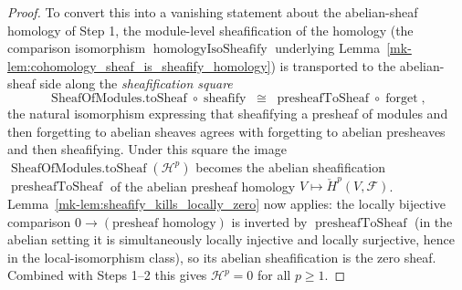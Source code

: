 \begin{proof}
  To convert this into a vanishing statement about the abelian-sheaf homology of Step 1, the
  module-level sheafification of the homology (the comparison isomorphism
  \(\operatorname{homologyIsoSheafify}\) underlying
  Lemma~\ref{mk-lem:cohomology_sheaf_is_sheafify_homology}) is transported to the abelian-sheaf side
  along the \emph{sheafification square}
  \[
    \operatorname{SheafOfModules.toSheaf} \circ \operatorname{sheafify}
      \;\cong\;
    \operatorname{presheafToSheaf} \circ \operatorname{forget},
  \]
  the natural isomorphism expressing that sheafifying a presheaf of modules and then forgetting to
  abelian sheaves agrees with forgetting to abelian presheaves and then sheafifying. Under this
  square the image \(\operatorname{SheafOfModules.toSheaf}(\mathcal{H}^p)\) becomes the abelian
  sheafification \(\operatorname{presheafToSheaf}\) of the abelian presheaf homology
  \(V \mapsto \check{H}^p(V, \mathcal{F})\). Lemma~\ref{mk-lem:sheafify_kills_locally_zero} now applies:
  the locally bijective comparison \(0 \to (\text{presheaf homology})\) is inverted by
  \(\operatorname{presheafToSheaf}\) (in the abelian setting it is simultaneously locally injective
  and locally surjective, hence in the local-isomorphism class), so its abelian sheafification is the
  zero sheaf. Combined with Steps 1--2 this gives \(\mathcal{H}^p = 0\) for all \(p \geq 1\).


\end{proof}
